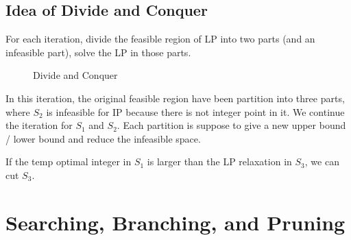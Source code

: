             \subsection{Idea of Divide and Conquer}
                For each iteration, divide the feasible region of LP into two parts (and an infeasible part), solve the LP in those parts.\\
                \begin{figure}[H]
                    \centering
                    \caption{Divide and Conquer}
                \end{figure}
                In this iteration, the original feasible region have been partition into three parts, where $S_2$ is infeasible for IP because there is not integer point in it. We continue the iteration for $S_1$ and $S_2$. Each partition is suppose to give a new upper bound / lower bound and reduce the infeasible space.

                If the temp optimal integer in $S_1$ is larger than the LP relaxation in $S_3$, we can cut $S_3$.
                
        \section{Searching, Branching, and Pruning}
